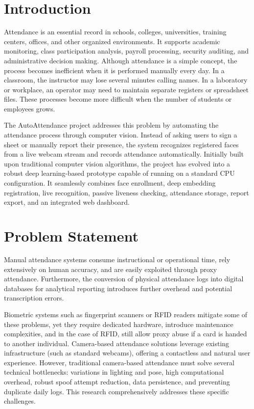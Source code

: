 \documentclass[12pt,a4paper]{report}
\newcommand{\JustifiedNormal}{\fontsize{12}{14}\selectfont\justifying\setlength{\parindent}{0pt}}
\begin{document}
\section{Introduction}
\JustifiedNormal
Attendance is an essential record in schools, colleges, universities, training centers, offices, and other organized environments. It supports academic monitoring, class participation analysis, payroll processing, security auditing, and administrative decision making. Although attendance is a simple concept, the process becomes inefficient when it is performed manually every day. In a classroom, the instructor may lose several minutes calling names. In a laboratory or workplace, an operator may need to maintain separate registers or spreadsheet files. These processes become more difficult when the number of students or employees grows.

The AutoAttendance project addresses this problem by automating the attendance process through computer vision. Instead of asking users to sign a sheet or manually report their presence, the system recognizes registered faces from a live webcam stream and records attendance automatically. Initially built upon traditional computer vision algorithms, the project has evolved into a robust deep learning-based prototype capable of running on a standard CPU configuration. It seamlessly combines face enrollment, deep embedding registration, live recognition, passive liveness checking, attendance storage, report export, and an integrated web dashboard.

\section{Problem Statement}
\JustifiedNormal
Manual attendance systems consume instructional or operational time, rely extensively on human accuracy, and are easily exploited through proxy attendance. Furthermore, the conversion of physical attendance logs into digital databases for analytical reporting introduces further overhead and potential transcription errors.

Biometric systems such as fingerprint scanners or RFID readers mitigate some of these problems, yet they require dedicated hardware, introduce maintenance complexities, and in the case of RFID, still allow proxy abuse if a card is handed to another individual. Camera-based attendance solutions leverage existing infrastructure (such as standard webcams), offering a contactless and natural user experience. However, traditional camera-based attendance must solve several technical bottlenecks: variations in lighting and pose, high computational overhead, robust spoof attempt reduction, data persistence, and preventing duplicate daily logs. This research comprehensively addresses these specific challenges.
\end{document}
